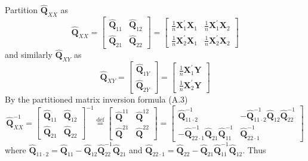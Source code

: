 \documentclass[10pt]{article}
\begin{document}
Partition $\widehat{\boldsymbol{Q}}_{X X}$ as
$$
\widehat{\boldsymbol{Q}}_{X X}=\left[\begin{array}{ll}
\widehat{\boldsymbol{Q}}_{11} & \widehat{\boldsymbol{Q}}_{12} \\
\widehat{\boldsymbol{Q}}_{21} & \widehat{\boldsymbol{Q}}_{22}
\end{array}\right]=\left[\begin{array}{ll}
\frac{1}{n} \boldsymbol{X}_{1}^{\prime} \boldsymbol{X}_{1} & \frac{1}{n} \boldsymbol{X}_{1}^{\prime} \boldsymbol{X}_{2} \\
\frac{1}{n} \boldsymbol{X}_{2}^{\prime} \boldsymbol{X}_{1} & \frac{1}{n} \boldsymbol{X}_{2}^{\prime} \boldsymbol{X}_{2}
\end{array}\right]
$$
and similarly $\widehat{\boldsymbol{Q}}_{X Y}$ as
$$
\widehat{\boldsymbol{Q}}_{X Y}=\left[\begin{array}{l}
\widehat{\boldsymbol{Q}}_{1 Y} \\
\widehat{\boldsymbol{Q}}_{2 Y}
\end{array}\right]=\left[\begin{array}{c}
\frac{1}{n} \boldsymbol{X}_{1}^{\prime} \boldsymbol{Y} \\
\frac{1}{n} \boldsymbol{X}_{2}^{\prime} \boldsymbol{Y}
\end{array}\right]
$$
By the partitioned matrix inversion formula (A.3)
$$
\widehat{\boldsymbol{Q}}_{X X}^{-1}=\left[\begin{array}{ll}
\widehat{\boldsymbol{Q}}_{11} & \widehat{\boldsymbol{Q}}_{12} \\
\widehat{\boldsymbol{Q}}_{21} & \widehat{\boldsymbol{Q}}_{22}
\end{array}\right]^{-1} \stackrel{\operatorname{def}}{=}\left[\begin{array}{cc}
\widehat{\boldsymbol{Q}}^{11} & \widehat{\boldsymbol{Q}}^{12} \\
\widehat{\boldsymbol{Q}}^{21} & \widehat{\boldsymbol{Q}}^{22}
\end{array}\right]=\left[\begin{array}{cc}
\widehat{\boldsymbol{Q}}_{11 \cdot 2}^{-1} & -\widehat{\boldsymbol{Q}}_{11 \cdot 2}^{-1} \widehat{\boldsymbol{Q}}_{12} \widehat{\boldsymbol{Q}}_{22}^{-1} \\
-\widehat{\boldsymbol{Q}}_{22 \cdot 1}^{-1} \widehat{\boldsymbol{Q}}_{21} \widehat{\boldsymbol{Q}}_{11}^{-1} & \widehat{\boldsymbol{Q}}_{22 \cdot 1}^{-1}
\end{array}\right]
$$
where $\widehat{\boldsymbol{Q}}_{11 \cdot 2}=\widehat{\boldsymbol{Q}}_{11}-\widehat{\boldsymbol{Q}}_{12} \widehat{\boldsymbol{Q}}_{22}^{-1} \widehat{\boldsymbol{Q}}_{21}$ and $\widehat{\boldsymbol{Q}}_{22 \cdot 1}=\widehat{\boldsymbol{Q}}_{22}-\widehat{\boldsymbol{Q}}_{21} \widehat{\boldsymbol{Q}}_{11}^{-1} \widehat{\boldsymbol{Q}}_{12}$. Thus
\end{document}
